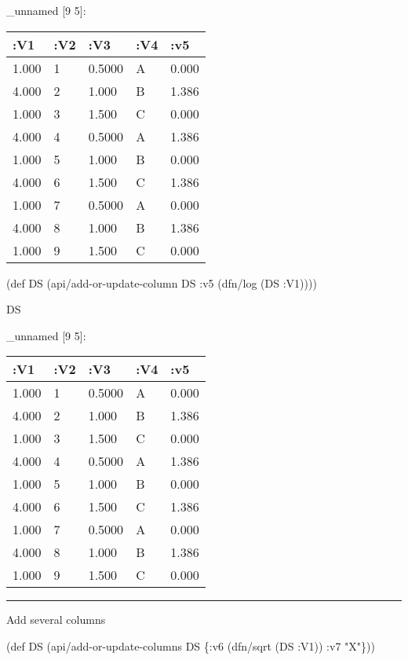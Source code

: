 \documentclass[]{article}
\newenvironment{Shaded}{\begin{snugshade}}{\end{snugshade}}
\newcommand{\StringTok}[1]{\textcolor[rgb]{0.31,0.60,0.02}{#1}}
\newcommand{\FunctionTok}[1]{\textcolor[rgb]{0.00,0.00,0.00}{#1}}
\newcommand{\BuiltInTok}[1]{#1}
\newcommand{\AttributeTok}[1]{\textcolor[rgb]{0.77,0.63,0.00}{#1}}
\newcommand{\NormalTok}[1]{#1}
\begin{document}
\_unnamed {[}9 5{]}:

\begin{longtable}[]{@{}lllll@{}}
\toprule
:V1 & :V2 & :V3 & :V4 & :v5\tabularnewline
\midrule
\endhead
1.000 & 1 & 0.5000 & A & 0.000\tabularnewline
4.000 & 2 & 1.000 & B & 1.386\tabularnewline
1.000 & 3 & 1.500 & C & 0.000\tabularnewline
4.000 & 4 & 0.5000 & A & 1.386\tabularnewline
1.000 & 5 & 1.000 & B & 0.000\tabularnewline
4.000 & 6 & 1.500 & C & 1.386\tabularnewline
1.000 & 7 & 0.5000 & A & 0.000\tabularnewline
4.000 & 8 & 1.000 & B & 1.386\tabularnewline
1.000 & 9 & 1.500 & C & 0.000\tabularnewline
\bottomrule
\end{longtable}

\begin{Shaded}
\begin{Highlighting}[]
\NormalTok{(}\BuiltInTok{def}\FunctionTok{ DS }\NormalTok{(api/add-or-update-column DS }\AttributeTok{:v5}\NormalTok{ (dfn/log (DS }\AttributeTok{:V1}\NormalTok{))))}
\end{Highlighting}
\end{Shaded}

\begin{Shaded}
\begin{Highlighting}[]
\NormalTok{DS}
\end{Highlighting}
\end{Shaded}

\_unnamed {[}9 5{]}:

\begin{longtable}[]{@{}lllll@{}}
\toprule
:V1 & :V2 & :V3 & :V4 & :v5\tabularnewline
\midrule
\endhead
1.000 & 1 & 0.5000 & A & 0.000\tabularnewline
4.000 & 2 & 1.000 & B & 1.386\tabularnewline
1.000 & 3 & 1.500 & C & 0.000\tabularnewline
4.000 & 4 & 0.5000 & A & 1.386\tabularnewline
1.000 & 5 & 1.000 & B & 0.000\tabularnewline
4.000 & 6 & 1.500 & C & 1.386\tabularnewline
1.000 & 7 & 0.5000 & A & 0.000\tabularnewline
4.000 & 8 & 1.000 & B & 1.386\tabularnewline
1.000 & 9 & 1.500 & C & 0.000\tabularnewline
\bottomrule
\end{longtable}

\begin{center}\rule{0.5\linewidth}{0.5pt}\end{center}

Add several columns

\begin{Shaded}
\begin{Highlighting}[]
\NormalTok{(}\BuiltInTok{def}\FunctionTok{ DS }\NormalTok{(api/add-or-update-columns DS \{}\AttributeTok{:v6}\NormalTok{ (dfn/sqrt (DS }\AttributeTok{:V1}\NormalTok{))}
                                       \AttributeTok{:v7} \StringTok{"X"}\NormalTok{\}))}
\end{Highlighting}
\end{Shaded}
\end{document}
